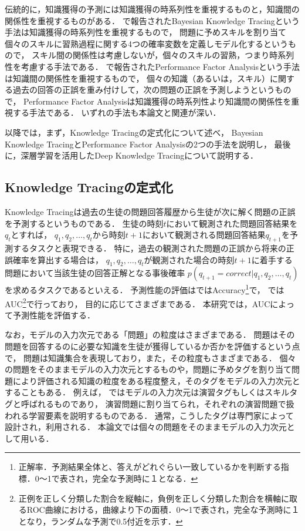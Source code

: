 伝統的に，知識獲得の予測には知識獲得の時系列性を重視するものと，知識間の関係性を重視するものがある．
\cite{corbett1994knowledge}で報告されたBayesian Knowledge Tracingという手法は知識獲得の時系列性を重視するもので，
問題に予めスキルを割り当て個々のスキルに習熟過程に関する4つの確率変数を定義しモデル化するというもので，
スキル間の関係性は考慮しないが，個々のスキルの習熟，つまり時系列性を考慮する手法である．
\cite{pavlik2009performance}で報告されたPerformance Factor Analysisという手法は知識間の関係性を重視するもので，
個々の知識（あるいは，スキル）に関する過去の回答の正誤を重み付けして，次の問題の正誤を予測しようというもので，
Performance Factor Analysisは知識獲得の時系列性より知識間の関係性を重視する手法である．
いずれの手法も本論文と関連が深い．


以降では，まず，Knowledge Tracingの定式化について述べ，
Bayesian Knowledge TracingとPerformance Factor Analysisの2つの手法を説明し，
最後に，深層学習を活用したDeep Knowledge Tracingについて説明する．


\subsection{Knowledge Tracingの定式化}
Knowledge Tracingは過去の生徒の問題回答履歴から生徒が次に解く問題の正誤を予測するというものである．
生徒の時刻$t$において観測された問題回答結果を$q_{t}$とすれば，
$q_1, q_2, \dots, q_t$から時刻$t+1$において観測される問題回答結果$q_{t+1}$を予測するタスクと表現できる．
特に，過去の観測された問題の正誤から将来の正誤確率を算出する場合は，
$q_1, q_2, \dots, q_t$が観測された場合の時刻$t+1$に着手する問題において当該生徒の回答正解となる事後確率
$p(q_{t+1} = correct|q_1, q_2, \dots, q_t)$を求めるタスクであるといえる．
予測性能の評価は\cite{yudelson2013individualized, falakmasir2015spectral}ではAccuracy\footnote{正解率．予測結果全体と、答えがどれぐらい一致しているかを判断する指標．0〜1で表され，完全な予測時に１となる．}で，
\cite{piech2015deep}ではAUC\footnote{正例を正しく分類した割合を縦軸に，負例を正しく分類した割合を横軸に取るROC曲線における，曲線より下の面積．0〜1で表され，完全な予測時に１となり，ランダムな予測で0.5付近を示す．}で行っており，
目的に応じてさまざまである．
本研究では，AUCによって予測性能を評価する．


なお，モデルの入力次元である「問題」の粒度はさまざまである．
問題はその問題を回答するのに必要な知識を生徒が獲得しているか否かを評価するという点で，
問題は知識集合を表現しており，また，その粒度もさまざまである．
個々の問題をそのままモデルの入力次元とするものや，問題に予めタグを割り当て問題により評価される知識の粒度をある程度整え，そのタグをモデルの入力次元とすることもある．
例えば，
\cite{piech2015deep}ではモデルの入力次元は演習タグもしくはスキルタグと呼ばれるものであり，
演習問題に割り当てられ，それぞれの演習問題で扱われる学習要素を説明するものである．
通常，こうしたタグは専門家によって設計され，利用される．
本論文では個々の問題をそのままモデルの入力次元として用いる．


